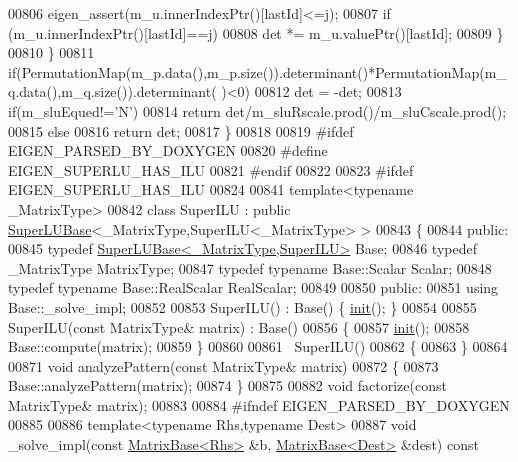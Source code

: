 \begin{DoxyCode}
00806       eigen\_assert(m\_u.innerIndexPtr()[lastId]<=j);
00807       \textcolor{keywordflow}{if} (m\_u.innerIndexPtr()[lastId]==j)
00808         det *= m\_u.valuePtr()[lastId];
00809     \}
00810   \}
00811   \textcolor{keywordflow}{if}(PermutationMap(m\_p.data(),m\_p.size()).determinant()*PermutationMap(m\_q.data(),m\_q.size()).determinant(
      )<0)
00812     det = -det;
00813   \textcolor{keywordflow}{if}(m\_sluEqued!=\textcolor{charliteral}{'N'})
00814     \textcolor{keywordflow}{return} det/m\_sluRscale.prod()/m\_sluCscale.prod();
00815   \textcolor{keywordflow}{else}
00816     \textcolor{keywordflow}{return} det;
00817 \}
00818 
00819 \textcolor{preprocessor}{#ifdef EIGEN\_PARSED\_BY\_DOXYGEN}
00820 \textcolor{preprocessor}{#define EIGEN\_SUPERLU\_HAS\_ILU}
00821 \textcolor{preprocessor}{#endif}
00822 
00823 \textcolor{preprocessor}{#ifdef EIGEN\_SUPERLU\_HAS\_ILU}
00824 
00841 \textcolor{keyword}{template}<\textcolor{keyword}{typename} \_MatrixType>
00842 \textcolor{keyword}{class }SuperILU : \textcolor{keyword}{public} \hyperlink{class_eigen_1_1_super_l_u_base}{SuperLUBase}<\_MatrixType,SuperILU<\_MatrixType> >
00843 \{
00844   \textcolor{keyword}{public}:
00845     \textcolor{keyword}{typedef} \hyperlink{class_eigen_1_1_super_l_u_base}{SuperLUBase<\_MatrixType,SuperILU>} Base;
00846     \textcolor{keyword}{typedef} \_MatrixType MatrixType;
00847     \textcolor{keyword}{typedef} \textcolor{keyword}{typename} Base::Scalar Scalar;
00848     \textcolor{keyword}{typedef} \textcolor{keyword}{typename} Base::RealScalar RealScalar;
00849 
00850   \textcolor{keyword}{public}:
00851     \textcolor{keyword}{using} Base::\_solve\_impl;
00852 
00853     SuperILU() : Base() \{ \hyperlink{structinit}{init}(); \}
00854 
00855     SuperILU(\textcolor{keyword}{const} MatrixType& matrix) : Base()
00856     \{
00857       \hyperlink{structinit}{init}();
00858       Base::compute(matrix);
00859     \}
00860 
00861     ~SuperILU()
00862     \{
00863     \}
00864     
00871     \textcolor{keywordtype}{void} analyzePattern(\textcolor{keyword}{const} MatrixType& matrix)
00872     \{
00873       Base::analyzePattern(matrix);
00874     \}
00875     
00882     \textcolor{keywordtype}{void} factorize(\textcolor{keyword}{const} MatrixType& matrix);
00883     
00884 \textcolor{preprocessor}{    #ifndef EIGEN\_PARSED\_BY\_DOXYGEN}
00885 
00886     \textcolor{keyword}{template}<\textcolor{keyword}{typename} Rhs,\textcolor{keyword}{typename} Dest>
00887     \textcolor{keywordtype}{void} \_solve\_impl(\textcolor{keyword}{const} \hyperlink{group___core___module_class_eigen_1_1_matrix_base}{MatrixBase<Rhs>} &b, \hyperlink{group___core___module_class_eigen_1_1_matrix_base}{MatrixBase<Dest>} &dest) \textcolor{keyword}{const}

\end{DoxyCode}
